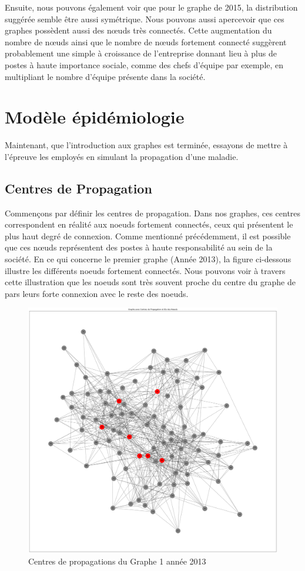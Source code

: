 \documentclass{article}
\begin{document}
Ensuite, nous pouvons également voir que pour le graphe de 2015, la distribution suggérée semble être aussi symétrique. Nous pouvons aussi apercevoir que ces graphes possèdent aussi des nœuds très connectés. Cette augmentation du nombre de nœuds ainsi que le nombre de nœuds fortement connecté suggèrent probablement une simple à croissance de l’entreprise donnant lieu à plus de postes à haute importance sociale, comme des chefs d’équipe par exemple, en multipliant le nombre d’équipe présente dans la société.

\section{Modèle épidémiologie}
Maintenant, que l'introduction aux graphes est terminée, essayons de mettre à l'épreuve les employés en simulant la propagation d'une maladie.
\subsection{Centres de Propagation}

Commençons par définir les centres de propagation. Dans nos graphes, ces centres correspondent en réalité aux noeuds fortement connectés, ceux qui présentent le plus haut degré de connexion. Comme mentionné précédemment, il est possible que ces nœuds représentent des postes à haute responsabilité au sein de la société.
En ce qui concerne le premier graphe (Année 2013), la figure ci-dessous illustre les différents noeuds fortement connectés. Nous pouvons voir à travers cette illustration que les noeuds sont très souvent proche du centre du graphe de pars leurs forte connexion avec le reste des noeuds.

\begin{figure}[!h]
    \centering
    \includegraphics[width=16.4cm]{assets/epidemiologie/centre_propa_2013}
    \caption{Centres de propagations du Graphe 1 année 2013}
    \label{fig:centre_propa_2013}
\end{figure}
\end{document}
